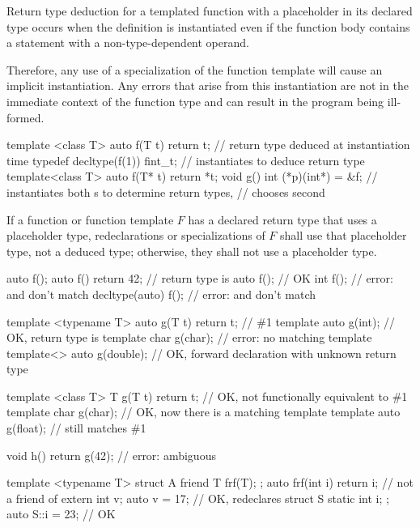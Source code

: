 \pnum
Return type deduction for a templated
function with a placeholder in its
declared type occurs when the definition is instantiated even if the function
body contains a  statement with a non-type-dependent operand.
\begin{note}
Therefore, any use of a specialization of the function template will
cause an implicit instantiation. Any errors that arise from this instantiation
are not in the immediate context of the function type and can result in the
program being ill-formed.
\end{note}
\begin{example}
\begin{codeblock}
template <class T> auto f(T t) { return t; }    // return type deduced at instantiation time
typedef decltype(f(1)) fint_t;                  // instantiates  to deduce return type
template<class T> auto f(T* t) { return *t; }
void g() { int (*p)(int*) = &f; }               // instantiates both s to determine return types,
                                                // chooses second
\end{codeblock}
\end{example}

\pnum
If a function or function template $F$ has
a declared return type that uses a placeholder type,
redeclarations or specializations of $F$ shall use that
placeholder type, not a deduced type;
otherwise, they shall not use a placeholder type.
\begin{example}
\begin{codeblock}
auto f();
auto f() { return 42; }                         // return type is 
auto f();                                       // OK
int f();                                        // error:  and  don't match
decltype(auto) f();                             // error:  and  don't match

template <typename T> auto g(T t) { return t; } // \#1
template auto g(int);                           // OK, return type is 
template char g(char);                          // error: no matching template
template<> auto g(double);                      // OK, forward declaration with unknown return type

template <class T> T g(T t) { return t; }       // OK, not functionally equivalent to \#1
template char g(char);                          // OK, now there is a matching template
template auto g(float);                         // still matches \#1

void h() { return g(42); }                      // error: ambiguous

template <typename T> struct A {
  friend T frf(T);
};
auto frf(int i) { return i; }                   // not a friend of 
extern int v;
auto v = 17;                                    // OK, redeclares 
struct S {
  static int i;
};
auto S::i = 23;                                 // OK
\end{codeblock}
\end{example}


